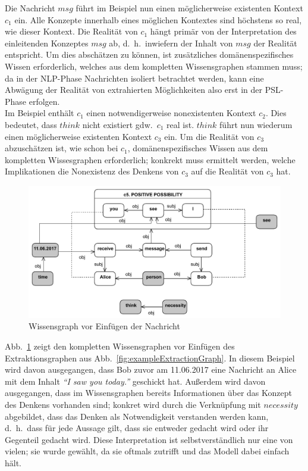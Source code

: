 \documentclass[11pt, a4paper]{scrreprt}
\begin{document}
Die Nachricht \(msg\) führt im Beispiel nun einen möglicherweise existenten Kontext \(c_1\) ein.
Alle Konzepte innerhalb eines möglichen Kontextes sind höchstens so real, wie dieser Kontext.
Die Realität von \(c_1\) hängt primär von der Interpretation des einleitenden Konzeptes \(msg\) ab, d.~h.\ inwiefern der Inhalt von \(msg\) der Realität entspricht.
Um dies abschätzen zu können, ist zusätzliches domänenspezifisches Wissen erforderlich, welches aus dem kompletten Wissensgraphen stammen muss;
da in der NLP-Phase Nachrichten isoliert betrachtet werden, kann eine Abwägung der Realität von extrahierten Möglichkeiten also erst in der PSL-Phase erfolgen.\\

Im Beispiel enthält \(c_1\) einen notwendigerweise nonexistenten Kontext \(c_2\).
Dies bedeutet, dass \(think\) nicht existiert gdw.\  \(c_1\) real ist.
\(think\) führt nun wiederum einen möglicherweise existenten Kontext \(c_3\) ein.
Um die Realität von \(c_3\) abzuschätzen ist, wie schon bei \(c_1\), domänenspezifisches Wissen aus dem kompletten Wissesgraphen erforderlich;
konkrekt muss ermittelt werden, welche Implikationen die Nonexistenz des Denkens von \(c_3\) auf die Realität von \(c_3\) hat.

\begin{figure}[H]
	\centering
	\includegraphics[width=0.8\linewidth]{assets/exampleOldKnowledgeGraph}
	\caption{Wissensgraph vor Einfügen der Nachricht}\label{fig:exampleOldKnowledgeGraph}
\end{figure}

Abb.~\ref{fig:exampleOldKnowledgeGraph} zeigt den kompletten Wissensgraphen vor Einfügen des Extraktionsgraphen aus Abb.~\ref{fig:exampleExtractionGraph}.
In diesem Beispiel wird davon ausgegangen, dass Bob zuvor am 11.06.2017 eine Nachricht an Alice mit dem Inhalt \emph{``I saw you today.''}  geschickt hat.
Außerdem wird davon ausgegangen, dass im Wissensgraphen bereits Informationen über das Konzept des Denkens vorhanden sind;
konkret wird durch die Verknüpfung mit \(necessity\) abgebildet, dass das Denken als Notwendigkeit verstanden werden kann, d.~h.\ dass für jede Aussage gilt, dass sie entweder gedacht wird oder ihr Gegenteil gedacht wird.
Diese Interpretation ist selbstverständlich nur eine von vielen;
sie wurde gewählt, da sie oftmals zutrifft und das Modell dabei einfach hält.\\
\end{document}
